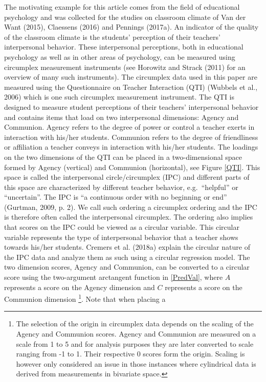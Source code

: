 \documentclass[man,mask]{apa6}
\let\rmarkdownfootnote\footnote%
\def\footnote{\protect\rmarkdownfootnote}
\DeclareRobustCommand{\VANDER}[3]{#2}
\begin{document}
The motivating example for this article comes from the field of educational
psychology and was collected for the studies on classroom climate of
\VANDER{Want}{Van der}{van der} Want (2015), Claessens (2016) and Pennings (2017a). An
indicator of the quality of the classroom climate is the students' perception of
their teachers' interpersonal behavior. These interpersonal perceptions, both in
educational psychology as well as in other areas of psychology, can be measured
using circumplex measurement instruments (see Horowitz and Strack (2011) for an
overview of many such instruments).\newline
\indent The circumplex data used in this paper are measured using the
Questionnaire on Teacher Interaction (QTI) (Wubbels et al., 2006) which is
one such circumplex measurement instrument. The QTI is designed to measure
student perceptions of their teachers' interpersonal behavior and contains items
that load on two interpersonal dimensions: Agency and Communion. Agency refers
to the degree of power or control a teacher exerts in interaction with his/her
students. Communion refers to the degree of friendliness or affiliation a
teacher conveys in interaction with his/her students. The loadings on the two
dimensions of the QTI can be placed in a two-dimensional space formed by Agency
(vertical) and Communion (horizontal), see Figure \ref{QTI}. This space is
called the interpersonal circle/circumplex (IPC) and different parts of this
space are characterized by different teacher behavior, e.g.~\enquote{helpful} or
\enquote{uncertain}. The IPC is ``a continuous order with no beginning or end''
(Gurtman, 2009, p. 2). We call such ordering a circumplex ordering and
the IPC is therefore often called the interpersonal circumplex. The ordering
also implies that scores on the IPC could be viewed as a circular variable. This
circular variable represents the type of interpersonal behavior that a teacher
shows towards his/her students.\newline
\indent Cremers et al. (2018a) explain the circular nature of the IPC data and
analyze them as such using a circular regression model. The two dimension
scores, Agency and Communion, can be converted to a circular score using the
two-argument arctangent function in \eqref{PredVal}, where \(A\) represents a score on the Agency dimension and
\(C\) represents a score on the Communion dimension \footnote{The selection of
the origin in circumplex data depends on the scaling of the Agency and Communion
scores. Agency and Communion are measured on a scale from 1 to 5 and for
analysis purposes they are later converted to scale ranging from -1 to 1.  Their
respective 0 scores form the origin. Scaling is however only considered an issue
in those instances where cylindrical data is derived from measurements in
bivariate space.}. Note that when placing a
\end{document}
